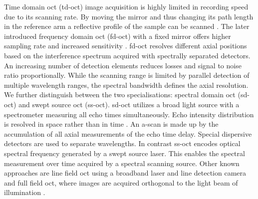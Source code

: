 Time domain \acrshort{oct} (\acrshort{td-oct}) image acquisition is highly limited in recording speed due to its scanning rate. By moving the mirror and thus changing its path length in the reference arm a reflective profile of the sample can be scanned \cite{Drexler.2008}. The later introduced frequency domain \acrshort{oct} (\acrshort{fd-oct}) with a fixed mirror offers higher sampling rate and increased sensitivity \cite{Stifter.2007}. \acrshort{fd-oct} resolves different axial positions based on the interference spectrum acquired with spectrally separated detectors. An increasing number of detection elements reduces losses and signal to noise ratio proportionally. While the scanning range is limited by parallel detection of multiple wavelength ranges, the spectral bandwidth defines the axial resolution. \cite{Gonzalo.2010} We further distinguish between the two specialisations: spectral domain \acrshort{oct} (\acrshort{sd-oct}) and swept source \acrshort{oct} (\acrshort{ss-oct}). \acrshort{sd-oct} utilizes a broad light source with a spectrometer measuring all echo times simultaneously. Echo intensity distribution is resolved in space rather than in time \cite{Kalkman.2017}. An \Gls{a-scan} is made up by the accumulation of all axial measurements of the echo time delay. Special dispersive detectors are used to separate wavelengths. \cite{Bille.2019} In contrast \acrshort{ss-oct} encodes optical spectral frequency generated by a swept source laser. This enables the spectral measurement over time acquired by a spectral scanning source. Other known approaches are line field \acrshort{oct} using a broadband laser and line detection camera \cite{ArnaudDubois.2018, Ruini.2021} and full field \acrshort{oct}, where images are acquired orthogonal to the light beam of illumination \cite{E.Beaurepaire.1998}.

